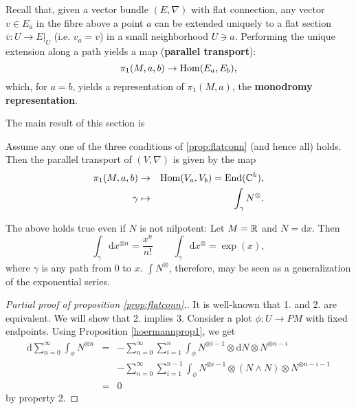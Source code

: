 Recall that, given a vector bundle $(E, \nabla)$ with flat connection, any vector $v \in E_a$ in the fibre above a point $a$ can be
extended uniquely to a flat section $\overline{v}: U \rightarrow E|_U$ (i.e. $v_a = v$) in a small neighborhood $U \ni a$.
Performing the unique extension along a path yields a map ({\bf parallel transport}):
\[  \pi_1(M, a, b) \rightarrow \mathrm{Hom}(E_a, E_b),  \]
which, for $a=b$, yields a representation of $\pi_1(M, a)$, the {\bf monodromy representation}.

The main result of this section is
\begin{prop}\label{prop:intismonodromy}
Assume any one of the three conditions of \ref{prop:flatconn} (and hence all) holds. 
Then the parallel transport of $(V, \nabla)$ is given by the map
\begin{eqnarray*}
\pi_1(M, a, b) &\rightarrow& \mathrm{Hom}(V_a, V_b) = \mathrm{End}(\mathbb{C}^k), \\
\gamma &\mapsto& \int_\gamma N^\otimes. 
\end{eqnarray*}
\end{prop}

\begin{exam} The above holds true even if $N$ is not nilpotent:
Let $M = \mathbb{R}$ and $N = \mathrm{d}x$. Then 
\[
\int_\gamma \mathrm{d}x^{\otimes n} = \frac{x^n}{n!} \qquad \int_\gamma \mathrm{d}x^\otimes = \exp(x),
\]
where $\gamma$ is any path from $0$ to $x$.
$\int N^\otimes$, therefore, may be seen as a generalization of the exponential series.
\end{exam}

\begin{proof}[Partial proof of proposition \ref{prop:flatconn}.]
It is well-known that 1. and 2. are equivalent. We will show that 2. implies 3. Consider a plot
$\phi: U \rightarrow PM$ with fixed endpoints. Using Proposition \ref{hoermannprop1}, we get
\begin{eqnarray*}
\mathrm{d} \sum_{n=0}^\infty \int_\phi N^{\otimes n} &=& -  \sum_{n=0}^\infty \sum_{i=1}^n \int_\phi N^{\otimes i-1} \otimes \mathrm{d}N \otimes N^{\otimes n-i}  \\
&&- \sum_{n=0}^\infty \sum_{i=1}^{n-1} \int_\phi N^{\otimes i-1} \otimes (N \wedge N) \otimes N^{\otimes n - i - 1} \\
&=&0 
\end{eqnarray*}
by property 2.
\end{proof}

